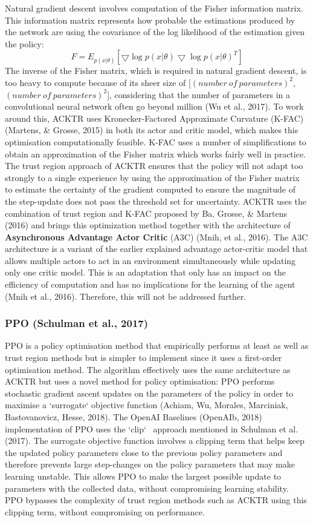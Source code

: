 Natural gradient descent involves computation of the Fisher information matrix. This information matrix represents how probable the estimations produced by the network are using the covariance of the log likelihood of the estimation given the policy: 
\[ F = E_{p(x|\theta)}[\bigtriangledown \log p(x|\theta) \bigtriangledown \log p(x|\theta)^{T}] \]
The inverse of the Fisher matrix, which is required in natural gradient descent, is too heavy to compute because of its sheer size of [$(number \ of \ parameters)^{2}$, $(number \ of \ parameters)^{2}$], considering that the number of parameters in a convolutional neural network often go beyond million (Wu et al., 2017). To work around this, ACKTR uses Kronecker-Factored Approximate Curvature (K-FAC) (Martens, \& Grosse, 2015) in both its actor and critic model, which makes this optimisation computationally feasible. K-FAC uses a number of simplifications to obtain an approximation of the Fisher matrix which works fairly well in practice. The trust region approach of ACKTR ensures that the policy will not adapt too strongly to a single experience by using the approximation of the Fisher matrix to estimate the certainty of the gradient computed to ensure the magnitude of the step-update does not pass the threshold set for uncertainty. ACKTR uses the combination of trust region and K-FAC proposed by Ba, Grosse, \& Martens (2016) and brings this optimization method together with the architecture of \textbf{Asynchronous Advantage Actor Critic} (A3C) (Mnih, et al., 2016). The A3C architecture is a variant of the earlier explained advantage actor-critic model that allows multiple actors to act in an environment simultaneously while updating only one critic model. This is an adaptation that only has an impact on the efficiency of computation and has no implications for the learning of the agent (Mnih et al., 2016). Therefore, this will not be addressed further.

\subsubsection*{PPO (Schulman et al., 2017)}
PPO is a policy optimisation method that empirically performs at least as well as trust region methods but is simpler to implement since it uses a first-order optimisation method. The algorithm effectively uses the same architecture as ACKTR but uses a novel method for policy optimisation: PPO performs stochastic gradient ascent updates on the parameters of the policy in order to maximise a `surrogate` objective function (Achiam, Wu, Morales, Marciniak, Bastovanovicz, Hesse, 2018). The OpenAI Baselines (OpenAIb, 2018) implementation of PPO uses the `clip` \ approach mentioned in Schulman et al. (2017). The surrogate objective function involves a clipping term that helps keep the updated policy parameters close to the previous policy parameters and therefore prevents large step-changes on the policy parameters that may make learning unstable. This allows PPO to make the largest possible update to parameters with the collected data, without compromising learning stability. PPO bypasses the complexity of trust region methods such as ACKTR using this clipping term, without compromising on performance.

